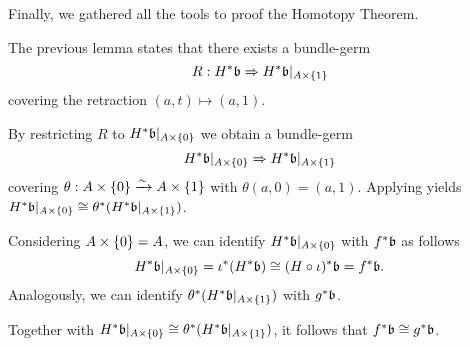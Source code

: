 \begin{myparagraph}
    Finally, we gathered all the tools to proof the Homotopy Theorem.
\end{myparagraph}

\begin{myproof}
    The previous lemma states that there exists a bundle-germ
    \[ \germdef{R}{\ind{H}\bb}{\ind{H}\bb[\cylup{A}]} \]
    covering the retraction $(a, t) \mapsto (a, 1)$.

    By restricting $R$ to $\ind{H}\bb[\cyldown{A}]$ we obtain a bundle-germ
    \[ \germ{\ind{H}\bb[\cyldown{A}]}{\ind{H}\bb[\cylup{A}]} \]
    covering $\theta: A \times{} \{0\} \xrightarrow{\sim} A \times{} \{1\}$ with $\theta(a, 0) = (a, 1)$.
    Applying  yields
    $\ind{H}\bb[\cyldown{A}] \cong \ind{\theta}(\ind{H}\bb[\cylup{A}])$.

    Considering $A \times{} \{0\} = A$,
    we can identify $\ind{H}\bb[\cyldown{A}]$ with $\ind{f}\bb$ as follows
    \[
        \ind{H}\bb[A \cross \{0\}] =
        \ind{\iota}(\ind{H}\bb) \cong
        \ind{(H \circ \iota)}\bb =
        \ind{f}\bb.
    \]
    Analogously, we can identify
    $\ind{\theta}(\ind{H}\bb[\cylup{A}])$ with $\ind{g}\bb$.

    Together with
    $\ind{H}\bb[\cyldown{A}] \cong \ind{\theta}(\ind{H}\bb[\cylup{A}])$,
    it follows that $\ind{f}\bb \cong \ind{g}\bb$.
\end{myproof}